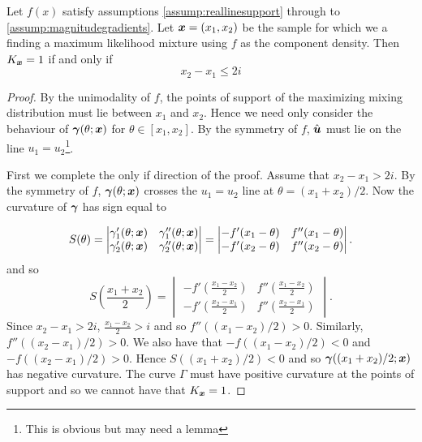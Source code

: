		\begin{theorem}
			\label{thm:n=2 inflection result}
			Let $f(x)$ satisfy assumptions \ref{assump:reallinesupport} through to \ref{assump:magnitudegradients}. Let ${\bm{{x}}} = (x_1,x_2)$ be the sample for which we a finding a maximum likelihood mixture using $f$ as the component density. Then $K_{\bm{{x}}} = 1$ if and only if
			\begin{equation}
				x_2 - x_1 \leq 2i
				\label{eq:x2-x1<int}
			\end{equation}
		\end{theorem}
		\begin{proof}
			By the unimodality of $f$, the points of support of the maximizing mixing distribution must lie between $x_1$ and $x_2$. Hence we need only consider the behaviour of ${\bm{{\gamma}}}(\theta;{\bm{{x}}})$ for $\theta \in [x_1,x_2]$. By the symmetry of $f$, $\hat{{\bm{{u}}}}$ must lie on the line $u_1 = u_2$\footnote{This is obvious but may need a lemma}.
			
			First we complete the only if direction of the proof. Assume that $x_2 - x_1 > 2i$. By the symmetry of $f$, ${\bm{{\gamma}}}(\theta;{\bm{{x}}})$ crosses the $u_1 = u_2$ line at $\theta = (x_1 + x_2)/2$. Now the curvature of ${\bm{{\gamma}}}$ has sign equal to
			
			\begin{equation}
				S(\theta) = 
				\begin{vmatrix}
					\gamma_1'(\theta;{\bm{{x}}})&\gamma_1''(\theta;{\bm{{x}}})\\
					\gamma_2'(\theta;{\bm{{x}}})&\gamma_2''(\theta;{\bm{{x}}})
				\end{vmatrix} = 
				\begin{vmatrix}
					-f'(x_1 - \theta) & f''(x_1 - \theta)\\
					-f'(x_2 - \theta) & f''(x_2 - \theta)
				\end{vmatrix}.
			\end{equation}
			and so
			\begin{equation}
				S\left(\frac{x_1+x_2}{2}\right) = 
				\begin{vmatrix}
					-f'(\frac{x_1 - x_2}{2}) & f''(\frac{x_1 - x_2}{2})\\
					-f'(\frac{x_2 - x_1}{2}) & f''(\frac{x_2 - x_1}{2})
				\end{vmatrix}.
			\end{equation}
			Since $x_2 - x_1 > 2i$, $\frac{x_1 - x_2}{2} > i$ and so $f''((x_1 - x_2)/2) > 0$. Similarly, $f''((x_2 - x_1)/2)>0$. We also have that $-f((x_1 - x_2)/2) < 0$ and $-f((x_2 - x_1)/2) > 0$. Hence $S((x_1 + x_2)/2)<0$ and so ${\bm{{\gamma}}}((x_1 + x_2)/2;{\bm{{x}}})$ has negative curvature. The curve $\Gamma$ must have positive curvature at the points of support and so we cannot have that $K_{\bm{{x}}} = 1$.
			

\end{proof}
